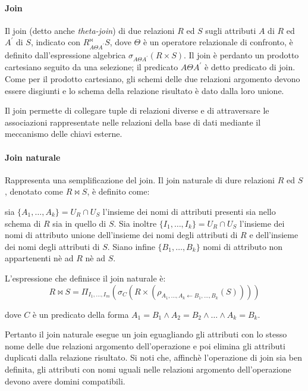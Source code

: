 \paragraph{Join}%
\label{par:Join}
Il join (detto anche \textit{theta-join}) di due relazioni $R$ ed $S$ sugli
attributi $A$ di $R$ ed $A^\prime$ di $S$, indicato con $R^{\bowtie}_{A\Theta
A^\prime}S$, dove $\Theta$ è un operatore relazionale di confronto, è definito
dall'espressione algebrica $\sigma_{A\Theta A^\prime}(R\times S)$.
Il join è perdanto un prodotto cartesiano seguito da una selezione; il predicato
$A\Theta A^\prime$ è detto predicato di join.
Come per il prodotto cartesiano, gli schemi delle due relazioni argomento devono
essere disgiunti e lo schema della relazione risultato è dato dalla loro unione.

Il join permette di collegare tuple di relazioni diverse e di attraversare le
associazioni rappresentate nelle relazioni della base di dati mediante il
meccanismo delle chiavi esterne.

\paragraph{Join naturale}%
\label{par:Join naturale}
Rappresenta una semplificazione del join.
Il join naturale di dure relazioni $R$ ed $S$, denotato come $R\bowtie S$, è
definito come:

sia $\{A_1,\dots,A_k\}=U_R\cap U_S$ l'insieme dei nomi di attributi presenti sia
nello schema di $R$ sia in quello di $S$.
Sia inoltre $\{I_1,\dots,I_k\}=U_R\cap U_S$ l'insieme dei nomi di attributo
unione dell'insieme dei nomi degli attributi di $R$ e dell'insieme dei nomi
degli attributi di $S$.
Siano infine $\{B_1,\dots,B_k\}$ nomi di attributo non appartenenti nè ad $R$ nè
ad $S$.

L'espressione che definisce il join naturale è:
\[
  R\bowtie S=\Pi_{I_1,\dots,I_m}(\sigma_C(R\times(\rho_{A_1,\dots,A_k\leftarrow
  B_1,\dots,B_k}(S))))
\]

dove $C$ è un predicato della forma $A_1=B_1\wedge A_2=B_2\wedge\dots\wedge
A_k=B_k$.

Pertanto il join naturale esegue un join eguagliando gli attributi con lo stesso
nome delle due relazioni argomento dell'operazione e poi elimina gli attributi
duplicati dalla relazione risultato.
Si noti che, affinchè l'operazione di join sia ben definita, gli attributi con
nomi uguali nelle relazioni argomento dell'operazione devono avere domini
compatibili.
